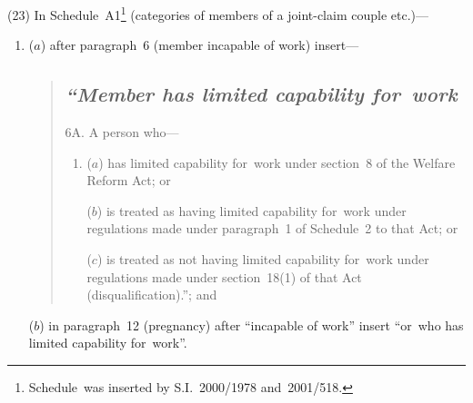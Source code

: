 \documentclass[12pt,a4paper]{article}
\begin{document}
(23) In Schedule~A1\footnote{Schedule~was inserted by S.I.~2000/1978 and~2001/518.} (categories of members of a joint-claim couple etc.)—
\begin{enumerate}\item[]
($a$) after paragraph~6 (member incapable of work) insert—
\begin{quotation}
\subsection*{\itshape “Member has limited capability for~work}

6A.  A person who—
\begin{enumerate}\item[]
($a$) has limited capability for~work under section~8 of the Welfare Reform Act; or

($b$) is treated as having limited capability for~work under regulations made under paragraph~1 of Schedule~2 to that Act; or

($c$) is treated as not having limited capability for~work under regulations made under section~18(1) of that Act (disqualification).”; and
\end{enumerate}
\end{quotation}

($b$) in paragraph~12 (pregnancy) after “incapable of work” insert “or~who has limited capability for~work”.
\end{enumerate}
\end{document}
